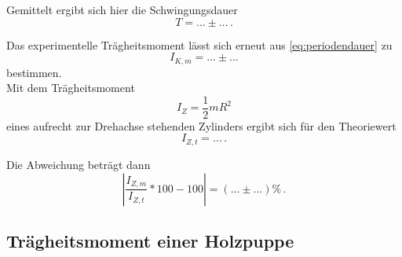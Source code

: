 Gemittelt ergibt sich hier die Schwingungsdauer
\begin{equation*}
  T = ... \pm ... \,.
\end{equation*}

Das experimentelle Trägheitsmoment lässt sich erneut aus \eqref{eq:periodendauer} zu
\begin{equation*}
  I_{K,m} = ... \pm ...
\end{equation*} 
bestimmen. \\

Mit dem Trägheitsmoment
\begin{equation}
  I_Z = \frac{1}{2} m R^2
\end{equation}
eines aufrecht zur Drehachse stehenden Zylinders ergibt sich für den Theoriewert
\begin{equation*}
  I_{Z,t} = ... \,.
\end{equation*}

Die Abweichung beträgt dann
\begin{equation*}
  \left|\frac{I_{Z,m}}{I_{Z,t}} * 100 - 100 \right| = (... \pm ...) \% \,.
\end{equation*}

\subsection{Trägheitsmoment einer Holzpuppe}
\label{subsec:e}
